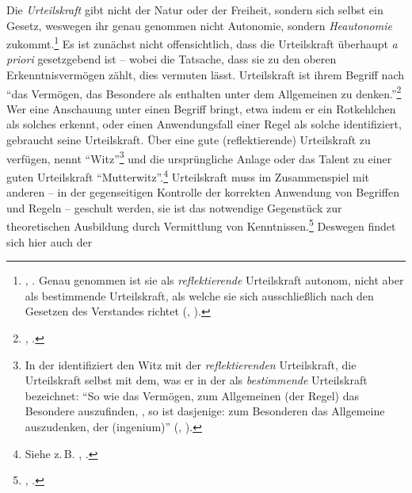 \begin{nummerierung}
\item{}\label{AutonomiederUrteilskraft} Die \textit{Urteilskraft}
gibt nicht der Natur oder der Freiheit, sondern sich selbst ein Gesetz, weswegen ihr genau
genommen nicht Autonomie, sondern \emph{Heautonomie}
zukommt.\footnote{\cite[Vgl.][B~xxxvii]{Kant:KritikderUrteilskraft2009},
\cite[][V: 185.35-186.1]{Kant:GesammelteWerke1900ff.}. Genau genommen ist sie
als \emph{reflektierende} Urteilskraft autonom, nicht aber als bestimmende
Urteilskraft, als welche sie sich ausschließlich nach den Gesetzen des
Verstandes richtet
\mkbibparens{\cite[Vgl.][\S~71]{Kant:KritikderUrteilskraft2009}, \cite[][V:
389.20-17]{Kant:GesammelteWerke1900ff.}}.}
Es ist zunächst nicht offensichtlich, dass die Urteilskraft überhaupt \emph{a
priori} gesetzgebend ist -- wobei die Tatsache, dass sie zu den oberen
Erkenntnisvermögen zählt, dies vermuten lässt. Urteilskraft ist ihrem Begriff
nach \enquote{das Vermögen, das Besondere als enthalten unter dem Allgemeinen zu
denken.}\footnote{\cite[][B xxv]{Kant:KritikderUrteilskraft2009},
\cite[][V: 179.19--20]{Kant:GesammelteWerke1900ff.}.} Wer eine Anschauung unter
einen Begriff bringt, etwa indem er ein Rotkehlchen als solches erkennt, oder
einen Anwendungsfall einer Regel als solche identifiziert, gebraucht seine
Urteilskraft. Über eine gute (reflektierende) Urteilskraft zu verfügen, nennt
 \enquote{Witz}\footnote{In der  identifiziert  den Witz mit der
\emph{reflektierenden} Urteilskraft, die Urteilskraft selbst mit dem, was er in
der  als \emph{bestimmende} Urteilskraft
bezeichnet: \enquote{So wie das Vermögen, zum Allgemeinen (der Regel) das
Besondere auszufinden, , so ist dasjenige: zum Besonderen das
Allgemeine auszudenken, der  (ingenium)} \mkbibparens{\cite[vgl.][BA
123]{Kant:AnthropologieinpragmatischerHinsicht1977}, \cite[][VII:
201.12--14]{Kant:GesammelteWerke1900ff.}}.} und die ursprüngliche
Anlage oder das Talent zu einer guten Urteilskraft
\enquote{Mutterwitz}.\footnote{Siehe z.\,B. \cite[][B
172]{Kant:KritikderreinenVernunft2003}, \cite[][III:
131.29]{Kant:GesammelteWerke1900ff.}.} Urteilskraft muss im Zusammenspiel mit
anderen -- in der gegenseitigen Kontrolle der korrekten Anwendung von Begriffen
und Regeln -- geschult werden, sie ist das notwendige Gegenstück zur
theoretischen Ausbildung durch Vermittlung von Kenntnissen.\footnote{\cite[Vgl.][B
172]{Kant:KritikderreinenVernunft2003}, \cite[][III:
131.21--132.2]{Kant:GesammelteWerke1900ff.}.} Deswegen findet sich hier auch der

\end{nummerierung}

